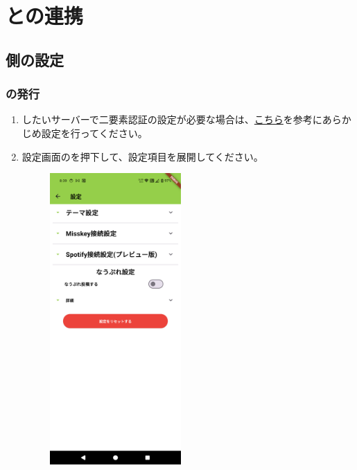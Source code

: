 \section{\mi との連携}
\label{sec:misskey1}
    \subsection{\mi 側の設定}
    \label{sec:misskey2}
        \subsubsection{\accessToken の発行}
        \label{sec:misskey3}
            \begin{enumerate}
                \item \nowplaying したい\mi サーバーで二要素認証の設定が必要な場合は、\href{https://support.misskey.io/hc/ja/articles/9354169842191-%E4%BA%8C%E8%A6%81%E7%B4%A0%E8%AA%8D%E8%A8%BC%E3%81%AE%E8%A8%AD%E5%AE%9A%E3%81%AB%E3%81%A4%E3%81%84%E3%81%A6}{こちら}を参考にあらかじめ設定を行ってください。
                \label{item:misskey1}
                \item 設定画面のを押下して、設定項目を展開してください。
                \label{item:misskey2}
                    \begin{figure}[htbp]
                        \begin{minipage}[b]{0.45\linewidth}
                            \centering
                            \includegraphics[width=5cm]{./pictures/misskey1.png}

\end{minipage}
\end{figure}
\end{enumerate}

